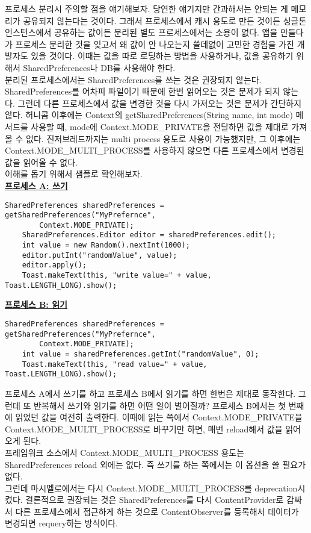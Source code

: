 프로세스 분리시 주의할 점을 얘기해보자.
당연한 얘기지만 간과해서는 안되는 게 메모리가 공유되지 않는다는 것이다. 
그래서 프로세스에서 캐시 용도로 만든 것이든 싱글톤 인스턴스에서 공유하는 값이든 분리된 별도 프로세스에서는 소용이 없다.
앱을 만들다가 프로세스 분리한 것을 잊고서 왜 값이 안 나오는지 쓸데없이 고민한 경험을 가진 개발자도 있을 것이다.
이때는 값을 따로 로딩하는 방법을 사용하거나, 값을 공유하기 위해서 SharedPreferences나 DB를 사용해야 한다.\\

분리된 프로세스에서는 SharedPreferences를 쓰는 것은 권장되지 않는다. 
SharedPreferences를 어차피 파일이기 때문에 한번 읽어오는 것은 문제가 되지 않는다.
그런데 다른 프로세스에서 값을 변경한 것을 다시 가져오는 것은 문제가 간단하지 않다.
허니콤 이후에는 Context의 getSharedPreferences(String name, int mode) 메서드를 사용할 때, mode에
Context.MODE\_PRIVATE을 전달하면 값을 제대로 가져올 수 없다.
진저브레드까지는 multi process 용도로 사용이 가능했지만, 그 이후에는 Context.MODE\_MULTI\_PROCESS를 사용하지 않으면 다른 프로세스에서 변경된 값을 읽어올 수 없다.\\

이해를 돕기 위해서 샘플로 확인해보자.\\
\underline{\bfseries 프로세스 A: 쓰기}
\begin{lstlisting}[frame=single] 
    SharedPreferences sharedPreferences = getSharedPreferences("MyPrefernce", 
    	Context.MODE_PRIVATE);
    SharedPreferences.Editor editor = sharedPreferences.edit();
    int value = new Random().nextInt(1000);
    editor.putInt("randomValue", value);
    editor.apply();
    Toast.makeText(this, "write value=" + value, Toast.LENGTH_LONG).show();
\end{lstlisting}

\underline{\bfseries 프로세스 B: 읽기}
\begin{lstlisting}[frame=single] 
	SharedPreferences sharedPreferences = getSharedPreferences("MyPrefernce", 
		Context.MODE_PRIVATE);
    int value = sharedPreferences.getInt("randomValue", 0);
    Toast.makeText(this, "read value=" + value, Toast.LENGTH_LONG).show();
\end{lstlisting}

프로세스 A에서 쓰기를 하고 프로세스 B에서 읽기를 하면 한번은 제대로 동작한다.
그런데 또 반복해서 쓰기와 읽기를 하면 어떤 일이 벌어질까?
프로세스 B에서는 첫 번째에 읽었던 값을 여전히 출력한다.
이때에 읽는 쪽에서 Context.MODE\_PRIVATE을 Context.MODE\_MULTI\_PROCESS로 바꾸기만 하면, 매번 reload해서 값을 읽어오게 된다.\\

프레임워크 소스에서 Context.MODE\_MULTI\_PROCESS 용도는 SharedPreferences reload 외에는 없다. 
즉 쓰기를 하는 쪽에서는 이 옵션을 쓸 필요가 없다.\\

그런데 마시멜로에서는 다시 Context.MODE\_MULTI\_PROCESS를 deprecation시켰다. 
결론적으로 권장되는 것은 SharedPreferences를 다시 ContentProvider로 감싸서 다른 프로세스에서 접근하게 하는 것으로 ContentObserver를 등록해서 데이터가 변경되면 requery하는 방식이다.


